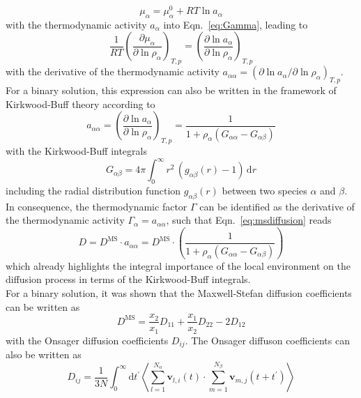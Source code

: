 \documentclass[aip,jcp,reprint]{revtex4-1}
\begin{document}
\begin{equation}
\mu_{\alpha} = \mu_{\alpha}^0 + RT\ln a_{\alpha}
\end{equation}
with the thermodynamic activity $a_{\alpha}$ into Eqn.~\eqref{eq:Gamma}, leading to
\begin{equation}
\label{eq:KBGamma}
\frac{1}{RT}\left(\frac{\partial \mu_{\alpha}}{\partial \ln \rho_{\alpha}}\right)_{T,p}=\left(\frac{\partial \ln a_{\alpha}}{\partial \ln \rho_{\alpha}}\right)_{T,p}
\end{equation}
with the derivative of the  thermodynamic activity  $a_{\alpha\alpha} = \left(\partial \ln a_{\alpha}/\partial \ln \rho_{\alpha}\right)_{T,p}$. For a binary solution, this expression can also be written in the framework of Kirkwood-Buff theory \cite{ben13a,smiatek18a,pierce08a,smith06}
according to 
\begin{equation}
\label{eq:act}
a_{\alpha\alpha} = \left(\frac{\partial \ln a_{\alpha}}{\partial \ln \rho_{\alpha}}\right)_{T,p} = \frac{1}{1+\rho_{\alpha}(G_{\alpha\alpha}-G_{\alpha\beta})}
\end{equation}
with the Kirkwood-Buff integrals 
\begin{equation}
\label{eq:KBI}
G_{\alpha\beta} = 4\pi \int_0^{\infty}r^2\, (g_{\alpha\beta}(r) - 1)\,\textrm{d}r
\end{equation}
including the radial distribution function $g_{\alpha\beta}(r)$ between two species $\alpha$ and $\beta$. In consequence, the thermodynamic factor $\Gamma$ can be identified as the derivative of the thermodynamic activity $\Gamma_{\alpha} = a_{\alpha\alpha}$, such that Eqn.~\eqref{eq:msdiffusion} reads 
\begin{equation}
\label{eq:DMS}
D= D^{\text{MS}}\cdot a_{\alpha\alpha} =  D^{\text{MS}}\cdot \left( \frac{1}{1+\rho_{\alpha}(G_{\alpha\alpha}-G_{\alpha\beta})}\right)
\end{equation}
which already highlights the integral importance of the local environment on the diffusion process in terms of the Kirkwood-Buff integrals. \\
For a binary solution, it was shown that the Maxwell-Stefan diffusion coefficients can be written as \cite{liu13a,rosenberger20a}
\begin{equation}
\label{eq:comp}
D^{\text{MS}} = \frac{x_2}{x_1}D_{11} + \frac{x_1}{x_2}D_{22} - 2D_{12}
\end{equation}
with the Onsager diffusion coefficients $D_{ij}$. 
The Onsager diffuson coefficients can also be written as \cite{liu13a}
\begin{equation}
D_{ij}= \frac{1}{3N}\int_0^{\infty}\textrm{d}t^{\prime}\left \langle \sum_{l=1}^{N_{\alpha}}\mathbf{v}_{l,i}(t)\cdot \sum_{m=1}^{N_{\beta}}\mathbf{v}_{m,j}(t+t^{\prime})\right\rangle
\end{equation}
\end{document}
